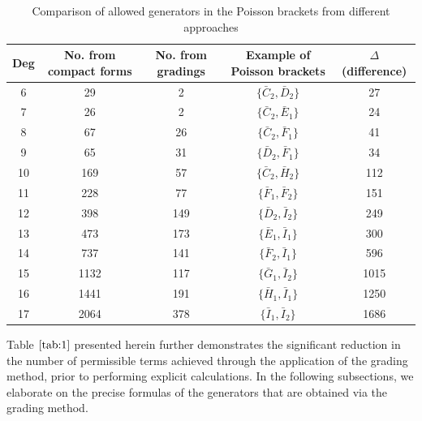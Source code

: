 \documentclass[10pt]{amsart}
\theoremstyle{definition}
\theoremstyle{corollary}
\theoremstyle{remark}
\theoremstyle{conclusion}
\begin{document}
\begin{table}[h]
    \centering
    \begin{tabular}{|c|c|c|c|c|}
        \hline
        Deg & No. from compact forms & No. from gradings & Example of Poisson brackets & $\Delta$ (difference) \\ \hline
        6    & 29     & 2     & $\{\bar{C}_2,\bar{D}_2\}$     & 27     \\ \hline
        7    & 26     & 2     & $ \{\bar{C}_2,\bar{E}_1\}$     & 24    \\ \hline
        8    & 67     & 26     & $\{\bar{C}_2,\bar{F}_1\}$     & 41     \\ \hline
        9    & 65     & 31     & $\{\bar{D}_2,\bar{F}_1\}$     & 34     \\ \hline
        10    & 169     & 57    & $\{\bar{C}_2,\bar{H}_2\}$     & 112     \\ \hline
        11    & 228     & 77     & $\{\bar{F}_1,\bar{F}_2\}$     & 151     \\ \hline
        12    & 398     & 149     & $\{\bar{D}_2,\bar{I}_2\}$     & 249     \\ \hline
        13    & 473     & 173    & $\{\bar{E}_1,\bar{I}_1\}$     & 300     \\ \hline
        14    & 737     & 141     & $\{\bar{F}_2,\bar{I}_1\}$     & 596     \\ \hline
        15   & 1132     & 117     & $\{\bar{G}_1,\bar{I}_2\}$     & 1015     \\ \hline
        16   & 1441     & 191     & $\{\bar{H}_1,\bar{I}_1\}$     & 1250     \\ \hline
        17   & 2064     & 378     & $ \{\bar{I}_1,\bar{I}_2\}$     & 1686     \\ \hline
    \end{tabular}
    
    \qquad
    
    \caption{Comparison of allowed generators in the Poisson brackets from different approaches}
    \label{tab:1}
\end{table}
Table $\ref{tab:1}$ presented herein further demonstrates the significant reduction in the number of permissible  terms achieved through the application of the grading method, prior to performing explicit calculations. In the following subsections, we elaborate on the precise formulas of the generators that are obtained via the grading  method.
\end{document}

